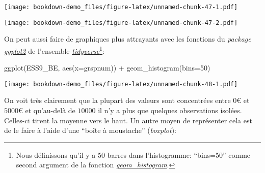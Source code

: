 \documentclass[
]{book}
\newenvironment{Shaded}{\begin{snugshade}}{\end{snugshade}}
\newcommand{\AttributeTok}[1]{\textcolor[rgb]{0.77,0.63,0.00}{#1}}
\newcommand{\DecValTok}[1]{\textcolor[rgb]{0.00,0.00,0.81}{#1}}
\newcommand{\FunctionTok}[1]{\textcolor[rgb]{0.00,0.00,0.00}{#1}}
\newcommand{\NormalTok}[1]{#1}
\newcommand{\SpecialCharTok}[1]{\textcolor[rgb]{0.00,0.00,0.00}{#1}}
\begin{document}
\begin{Shaded}
\end{Shaded}

\texttt{[image: bookdown-demo\_files/figure-latex/unnamed-chunk-47-1.pdf]}

\begin{Shaded}
\end{Shaded}

\texttt{[image: bookdown-demo\_files/figure-latex/unnamed-chunk-47-2.pdf]}

On peut aussi faire de graphiques plus attrayants avec les fonctions du \emph{package} \href{https://ggplot2.tidyverse.org/}{\emph{ggplot2}} de l'ensemble \href{https://www.tidyverse.org/}{\emph{tidyverse}}\footnote{Nous définissons qu'il y a 50 barres dans l'histogramme: ``bins=50'' comme second argument de la fonction \href{https://ggplot2.tidyverse.org/reference/geom_histogram.html}{\emph{geom\_histogram}}.}:

\begin{Shaded}
\begin{Highlighting}[]
\FunctionTok{ggplot}\NormalTok{(ESS9\_BE, }\FunctionTok{aes}\NormalTok{(}\AttributeTok{x=}\NormalTok{grspnum)) }\SpecialCharTok{+}
  \FunctionTok{geom\_histogram}\NormalTok{(}\AttributeTok{bins=}\DecValTok{50}\NormalTok{)}
\end{Highlighting}
\end{Shaded}

\texttt{[image: bookdown-demo\_files/figure-latex/unnamed-chunk-48-1.pdf]}

On voit très clairement que la plupart des valeurs sont concentrées entre \(0€\) et \(5000€\) et qu'au-delà de \(10000\) il n'y a plus que quelques observations isolées. Celles-ci tirent la moyenne vers le haut. Un autre moyen de représenter cela est de le faire à l'aide d'une ``boîte à moustache'' (\emph{boxplot}):

\begin{Shaded}
\end{Shaded}
\end{document}
